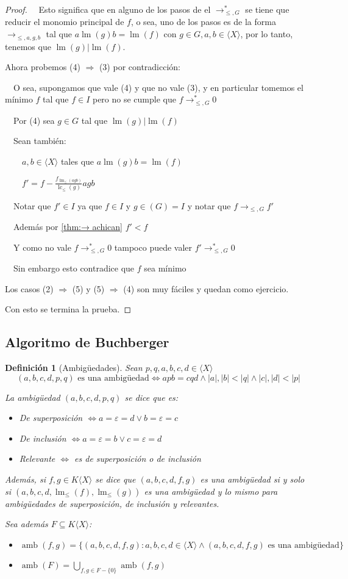 \documentclass{amsbook} %
\theoremstyle{customstyle}
\newtheorem{definition}{Definición}[section]
\DeclareMathOperator{\lm}{lm}
\DeclareMathOperator{\lc}{lc}
\DeclareMathOperator{\amb}{amb}
\begin{document}
\begin{proof}
  Esto significa que en alguno de los pasos de el $→^*_{≤, G}$ se tiene que reducir el monomio principal de $f$, o sea, uno de los pasos es de la forma $→_{≤, a, g, b}$ tal que $a \lm(g) b = \lm(f)$ con $g ∈ G, a, b ∈ ⟨X⟩$, por lo tanto, tenemos que $\lm(g) | \lm(f)$.

Ahora probemos (4) $⇒$ (3) por contradicción:

  O sea, supongamos que vale (4) y que no vale (3), y en particular tomemos el mínimo $f$ tal que $f ∈ I$ pero no se cumple que $f →^*_{≤, G} 0$

  Por (4) sea $g ∈ G$ tal que $\lm(g) | \lm(f)$

  Sean también:

    $a, b ∈ ⟨X⟩$ tales que $a \lm(g) b = \lm(f)$

    $f' = f - \frac{f_{\lm_≤(agb)}}{\lc_≤(g)}agb$

  Notar que $f' ∈ I$ ya que $f ∈ I$ y $g ∈ (G) = I$ y notar que $f →_{≤, G} f'$

  Además por \cref{thm:→ achican} $f' < f$

  Y como no vale $f →^*_{≤, G} 0$ tampoco puede valer $f' →^*_{≤, G} 0$

  Sin embargo esto contradice que $f$ sea mínimo

Los casos (2) $⇒$ (5) y (5) $⇒$ (4) son muy fáciles y quedan como ejercicio. %

Con esto se termina la prueba.

\end{proof}


\subsection{Algoritmo de Buchberger}

\begin{definition}[Ambigüedades]
Sean $p, q, a, b, c, d ∈ ⟨X⟩$
\[ (a, b, c, d, p, q)\text{ es una ambigüedad} ⇔ apb = cqd ∧ |a|, |b| < |q| ∧ |c|, |d| < |p| \]

La ambigüedad $(a, b, c, d, p, q)$ se dice que es:
\begin{itemize}
\item De superposición $⇔ a = ε = d ∨ b = ε = c$
\item De inclusión $⇔ a = ε = b ∨ c = ε = d$
\item Relevante $⇔$ es de superposición o de inclusión
\end{itemize}

Además, si $f, g ∈ K⟨X⟩$ se dice que $(a, b, c, d, f, g)$ es una ambigüedad si y solo si $(a, b, c, d, \lm_≤{(f)}, \lm_≤{(g)})$ es una ambigüedad y lo mismo para ambigüedades de superposición, de inclusión y relevantes.

Sea además $F ⊆ K⟨X⟩$:
\begin{itemize}
\item $\amb(f, g) = \{(a, b, c, d, f, g) : a, b, c, d ∈ ⟨X⟩ ∧ (a, b, c, d, f, g)\text{ es una ambigüedad}\}$
\item $\amb(F) = ⋃_{f, g ∈ F - \{0\}}{\amb(f, g)}$
\end{itemize}

\end{definition}
\end{document}
